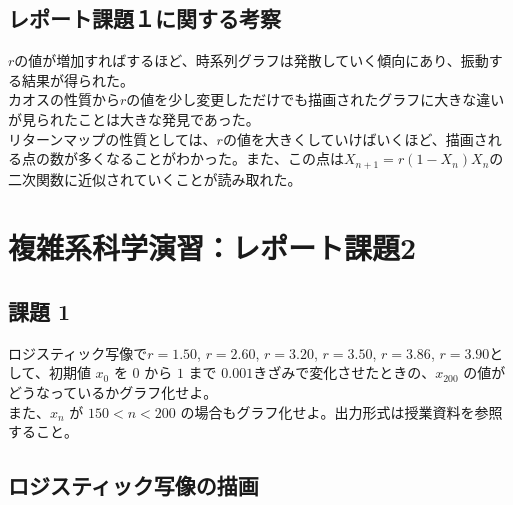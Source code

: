 \documentclass[a4j]{jsarticle}
\begin{document}
\subsection{レポート課題１に関する考察}
$r$の値が増加すればするほど、時系列グラフは発散していく傾向にあり、振動する結果が得られた。\\
カオスの性質から$r$の値を少し変更しただけでも描画されたグラフに大きな違いが見られたことは大きな発見であった。\\
リターンマップの性質としては、$r$の値を大きくしていけばいくほど、描画される点の数が多くなることがわかった。また、この点は$X_{n+1} = r(1 - X_n)X_n$の二次関数に近似されていくことが読み取れた。

\newpage

\section{複雑系科学演習：レポート課題2}

\subsection{課題 1}
  ロジスティック写像で$r = 1.50$, $r = 2.60$, $r = 3.20$, $r = 3.50$, $r = 3.86$, $r = 3.90$として、初期値 $x_{0}$ を $0$ から $1$ まで $0.001$きざみで変化させたときの、$x_{200}$ の値がどうなっているかグラフ化せよ。\\
また、$x_{n}$ が $150 < n < 200$ の場合もグラフ化せよ。出力形式は授業資料を参照すること。

\subsection{ロジスティック写像の描画}
\end{document}
